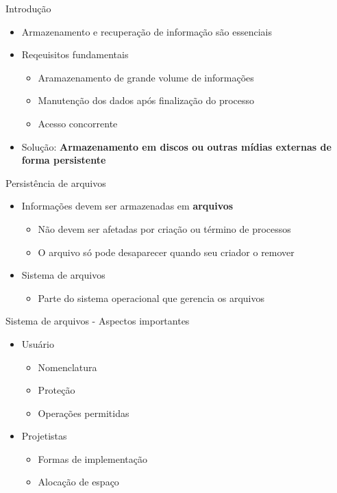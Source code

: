 \documentclass[aspectratio=169,
				xcolor=table]{beamer}
\begin{document}
	\begin{frame}{Introdução}
		\begin{itemize}
			\item Armazenamento e recuperação de informação são essenciais
			\vspace{1em}
			\item Reqeuisitos fundamentais
			\begin{itemize}
				\item Aramazenamento de grande volume de informações
				\item Manutenção dos dados após finalização do processo
				\item Acesso concorrente
			\end{itemize}
			\vspace{2em}
			\item \alert{Solução:} \textbf{Armazenamento em discos ou outras mídias externas de forma persistente}			
			
		\end{itemize}
	\end{frame}
	
	\begin{frame}{Persistência de arquivos}
		\begin{itemize}
			\item Informações devem ser armazenadas em \textbf{arquivos}
			\begin{itemize}
				\item Não devem ser afetadas por criação ou término de processos
				\item O arquivo só pode desaparecer quando seu criador o remover
			\end{itemize}
			\vspace{1.5em}
			\item Sistema de arquivos
			\begin{itemize}
				\item Parte do sistema operacional que gerencia os arquivos
			\end{itemize}
		\end{itemize}
		
	\end{frame}
	\begin{frame}{Sistema de arquivos - Aspectos importantes}
		\begin{itemize}
			\item Usuário
			\begin{itemize}
				\item Nomenclatura
				\item Proteção
				\item Operações permitidas
			\end{itemize}
			\vspace{1em}
			\item Projetistas
			\begin{itemize}
				\item Formas de implementação
				\item Alocação de espaço
			\end{itemize}
		\end{itemize}
		
	\end{frame}
	
\end{document}
